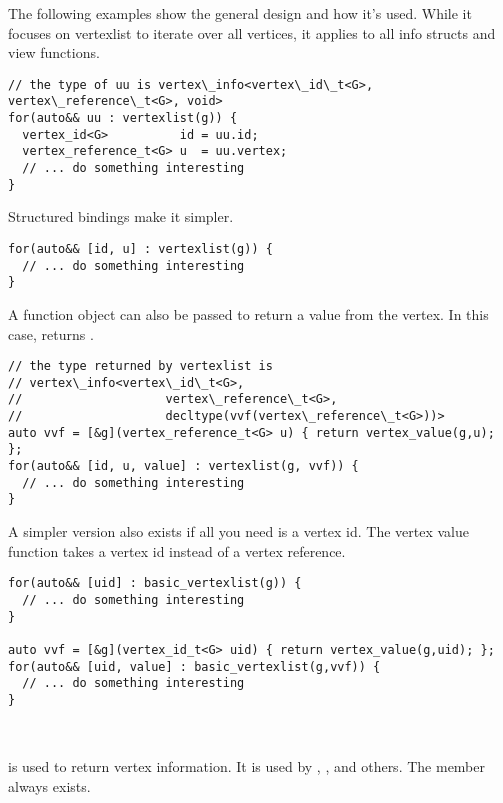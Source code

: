 The following examples show the general design and how it's used. While it focuses 
on vertexlist to iterate over all vertices, it applies to all info structs and view functions.

\begin{lstlisting}
// the type of uu is vertex\_info<vertex\_id\_t<G>, vertex\_reference\_t<G>, void>
for(auto&& uu : vertexlist(g)) {
  vertex_id<G>          id = uu.id;
  vertex_reference_t<G> u  = uu.vertex;
  // ... do something interesting
}
\end{lstlisting}

Structured bindings make it simpler.
\begin{lstlisting}
for(auto&& [id, u] : vertexlist(g)) {
  // ... do something interesting
}
\end{lstlisting}

A function object can also be passed to return a value from the vertex. In this case,  returns .
\begin{lstlisting}
// the type returned by vertexlist is 
// vertex\_info<vertex\_id\_t<G>, 
//                    vertex\_reference\_t<G>, 
//                    decltype(vvf(vertex\_reference\_t<G>))>
auto vvf = [&g](vertex_reference_t<G> u) { return vertex_value(g,u); };
for(auto&& [id, u, value] : vertexlist(g, vvf)) {
  // ... do something interesting
}
\end{lstlisting}

A simpler version also exists if all you need is a vertex id. The vertex value function takes a vertex id
instead of a vertex reference.
\begin{lstlisting}
for(auto&& [uid] : basic_vertexlist(g)) {
  // ... do something interesting
}

auto vvf = [&g](vertex_id_t<G> uid) { return vertex_value(g,uid); };
for(auto&& [uid, value] : basic_vertexlist(g,vvf)) {
  // ... do something interesting
}
\end{lstlisting}

\subsection{}\label{vertex-view}\mbox{} \\
 is used to return vertex information. It is used by , , 
 and others. The  member always exists.

